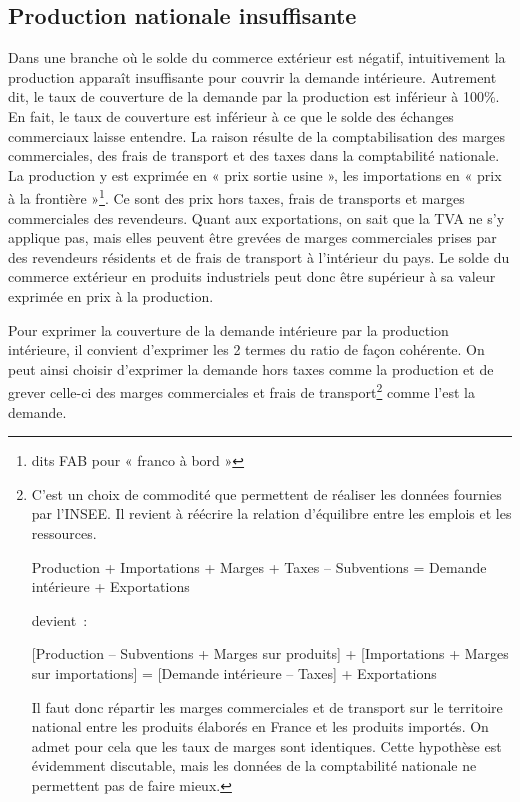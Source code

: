 \documentclass[a4paper]{article}
\begin{document}
\subsection{Production nationale insuffisante}
Dans une branche où le solde du commerce extérieur est négatif, intuitivement la production apparaît insuffisante pour couvrir la demande intérieure. Autrement dit, le taux de couverture  de la demande par la production est inférieur à 100\%. En fait, le taux de couverture est inférieur à ce que le solde des échanges commerciaux laisse entendre. La raison résulte de la comptabilisation des marges commerciales, des frais de transport et des taxes dans la comptabilité nationale. La production y est exprimée en « prix sortie usine », les importations en « prix à la frontière »\footnote{dits FAB pour « franco à bord »}. Ce sont des prix hors taxes, frais de transports et marges commerciales des revendeurs. Quant aux exportations, on sait que la TVA ne s’y applique pas, mais elles peuvent être grevées de marges commerciales prises par des revendeurs résidents et de frais de transport à l’intérieur du pays. Le solde du commerce extérieur en produits industriels peut donc être supérieur à sa valeur exprimée en prix à la production.

Pour exprimer la couverture de la demande intérieure par la production intérieure, il convient d’exprimer les 2 termes du ratio de façon cohérente. On peut ainsi choisir d’exprimer la demande hors taxes comme la production et de grever celle-ci des marges commerciales et frais de transport\footnote{C’est un choix de commodité que permettent de réaliser les données fournies par l’INSEE. Il revient à réécrire la relation d’équilibre entre les emplois et les ressources.

Production + Importations + Marges + Taxes – Subventions = Demande intérieure + Exportations

devient~:

[Production – Subventions + Marges sur produits] + [Importations + Marges sur importations] = [Demande intérieure – Taxes] + Exportations

Il faut donc répartir les marges commerciales et de transport sur le territoire national entre les produits élaborés en France et les produits importés. On admet pour cela que les taux de marges sont identiques. Cette hypothèse est évidemment discutable, mais les données de la comptabilité nationale ne permettent pas de faire mieux.} comme l’est la demande.
\end{document}
